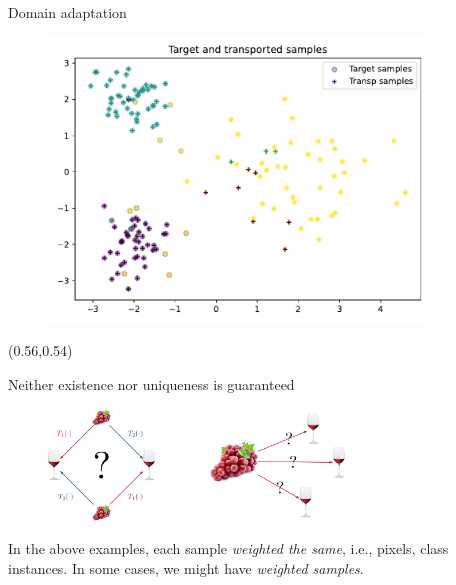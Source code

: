 \documentclass[pdf,aspectratio=169,10pt]{beamer}
\begin{document}
\begin{frame}{ Domain adaptation}
\begin{minipage}{0.49\textwidth}
\end{minipage}
\hfill
\begin{minipage}{0.49\textwidth}
    \begin{figure}
        \includegraphics[width=0.9\textwidth]{../img/DA_samples.pdf}
    \end{figure}
\end{minipage}

\begin{textblock}{0.45}(0.56,0.54)
\small
{}
\end{textblock}
\end{frame}





\begin{frame}{Neither existence nor uniqueness is guaranteed}
        \begin{figure}
        \includegraphics[width=0.7\textwidth]{../img/existence_uniqueness.pdf}
    \end{figure}
    \vspace{1em}
 In the above examples, each sample \emph{weighted the same}, i.e., pixels, class instances. In some cases, we might have \emph{weighted samples}.
\end{frame}
\end{document}
